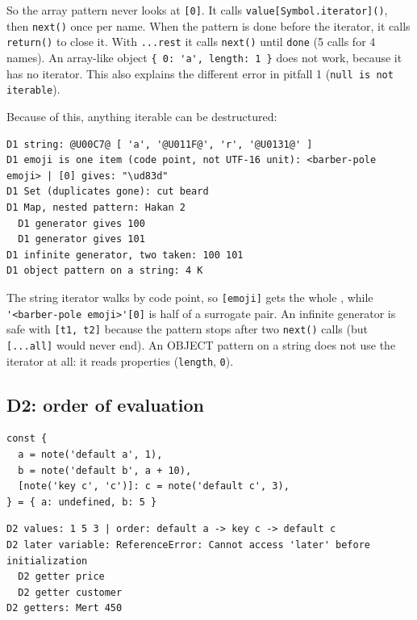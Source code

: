 So the array pattern never looks at \passthrough{\lstinline![0]!}. It calls \passthrough{\lstinline!value[Symbol.iterator]()!}, then \passthrough{\lstinline!next()!} once per name. When the pattern is
done before the iterator, it calls \passthrough{\lstinline!return()!} to close it. With \passthrough{\lstinline!...rest!} it calls \passthrough{\lstinline!next()!} until \passthrough{\lstinline!done!} (5 calls for 4 names).
An array-like object \passthrough{\lstinline!\{ 0: 'a', length: 1 \}!} does not work, because it has no iterator. This also explains the different error in pitfall 1 (\passthrough{\lstinline!null is not iterable!}).

Because of this, anything iterable can be destructured:

\begin{lstlisting}
D1 string: @U00C7@ [ 'a', '@U011F@', 'r', '@U0131@' ]
D1 emoji is one item (code point, not UTF-16 unit): <barber-pole emoji> | [0] gives: "\ud83d"
D1 Set (duplicates gone): cut beard
D1 Map, nested pattern: Hakan 2
  D1 generator gives 100
  D1 generator gives 101
D1 infinite generator, two taken: 100 101
D1 object pattern on a string: 4 K
\end{lstlisting}

The string iterator walks by code point, so \passthrough{\lstinline![emoji]!} gets the whole , while \passthrough{\lstinline!'<barber-pole emoji>'[0]!} is half of a surrogate pair.
An infinite generator is safe with \passthrough{\lstinline![t1, t2]!} because the pattern stops after two \passthrough{\lstinline!next()!} calls (but \passthrough{\lstinline![...all]!} would never end).
An OBJECT pattern on a string does not use the iterator at all: it reads properties (\passthrough{\lstinline!length!}, \passthrough{\lstinline!0!}).

\subsection{D2: order of evaluation}\label{d2-order-of-evaluation}

\begin{lstlisting}
const {
  a = note('default a', 1),
  b = note('default b', a + 10),
  [note('key c', 'c')]: c = note('default c', 3),
} = { a: undefined, b: 5 }
\end{lstlisting}

\begin{lstlisting}
D2 values: 1 5 3 | order: default a -> key c -> default c
D2 later variable: ReferenceError: Cannot access 'later' before initialization
  D2 getter price
  D2 getter customer
D2 getters: Mert 450
\end{lstlisting}

